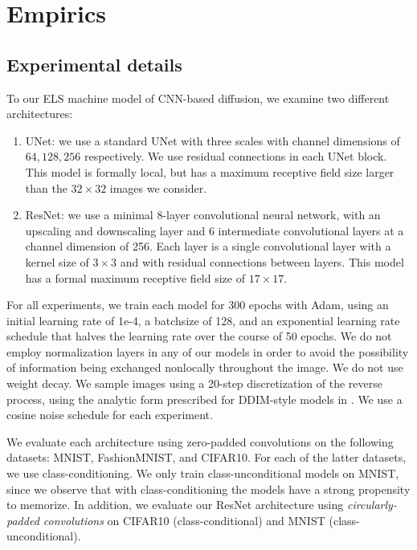 \documentclass{article}
\theoremstyle{plain}
\theoremstyle{definition}
\theoremstyle{remark}
\begin{document}
\section{Empirics}\label{app:empirics}

\subsection{Experimental details}\label{sec:exp_details}

To our ELS machine model of CNN-based diffusion, we examine two different architectures:
\begin{enumerate}%
    \item UNet: we use a standard UNet \cite{ronneberger2015u} with three scales with channel dimensions of $64,128,256$ respectively. We use residual connections in each UNet block. This model is formally local, but has a maximum receptive field size larger than the $32\times 32$ images we consider.
    \item ResNet: we use a minimal 8-layer convolutional neural network, with an upscaling and downscaling layer and 6 intermediate convolutional layers at a channel dimension of 256. Each layer is a single convolutional layer with a kernel size of $3 \times 3$ and with residual connections \cite{he2016deep} between layers. This model has a formal maximum receptive field size of $17 \times 17$.
\end{enumerate}
For all experiments, we train each model for 300 epochs with Adam, using an initial learning rate of 1e-4, a batchsize of 128, and an exponential learning rate schedule that halves the learning rate over the course of 50 epochs. We do not employ normalization layers in any of our models in order to avoid the possibility of information being exchanged nonlocally throughout the image. We do not use weight decay. We sample images using a 20-step discretization of the reverse process, using the analytic form prescribed for DDIM-style models in \cite{song2020denoising}. We use a cosine noise schedule \cite{nichol2021improved} for each experiment.

We evaluate each architecture using zero-padded convolutions on the following datasets: MNIST, FashionMNIST, and CIFAR10. For each of the latter datasets, we use class-conditioning. We only train class-unconditional models on MNIST, since we observe that with class-conditioning the models have a strong propensity to memorize. In addition, we evaluate our ResNet architecture using \textit{circularly-padded convolutions} on CIFAR10 (class-conditional) and MNIST (class-unconditional). 
\end{document}
